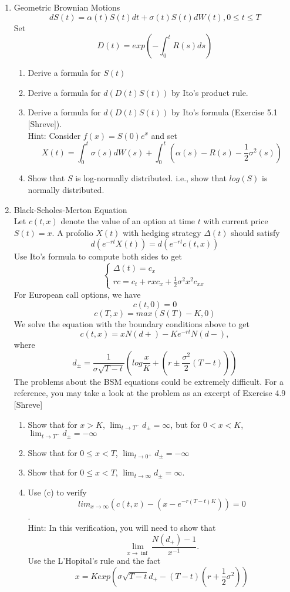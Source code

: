 \documentclass[12pt]{article}
\begin{document}
\begin{enumerate}
\begin{enumerate}
\end{enumerate}
\newpage
\item Geometric Brownian Motions
\[dS(t) = \alpha(t)S(t)dt+\sigma(t)S(t)dW(t), 0\leq t\leq T\]
Set 
\[ D(t) = exp\left(-\int_0^t R(s)ds\right)\]
\begin{enumerate}
\item Derive a formula for $S(t)$
\item Derive a formula for $d(D(t)S(t))$ by Ito's product rule.
\item Derive a formula for $d(D(t)S(t))$ by Ito's formula (Exercise 5.1 [Shreve]). 
\\
Hint: Consider $f(x) = S(0)e^x$ and set 
\[
X(t) = \int_0^t \sigma(s)dW(s) + \int_0^t \left(\alpha(s)-R(s)-\frac12\sigma^2(s) \right)
\]
\item Show that $S$ is log-normally distributed. i.e., show that $log(S)$ is normally distributed.
\end{enumerate}
\newpage
\item Black-Scholes-Merton Equation
\\
Let $c(t,x)$ denote the value of an option at time $t$ with current price $S(t)=x$. A profolio $X(t)$ with hedging strategy $\Delta(t)$ should satisfy
\[
d(e^{-rt}X(t)) = d(e^{-rt}c(t,x))
\]
Use Ito's formula to compute both sides to get
\[
\left\{
\begin{array}{l}
\Delta(t) = c_x \\
rc = c_t +rxc_x + \frac12 \sigma^2 x^2 c_{xx}
\end{array}
\right.
\]
For European call options, we have
\[
c(t,0) = 0
\]
\[
c(T,x) = max(S(T)-K, 0)
\]
We solve the equation with the boundary conditions above to get 
\[
c(t,x)=xN(d+)-Ke^{-rt}N(d-),
\]
where
\[
d_{\pm} = \frac1{\sigma\sqrt{T-t}} \left(log \frac xK + \left(r\pm \frac {\sigma^2}{2}(T-t) \right) \right)
\]
The problems about the BSM equations could be extremely difficult. For a reference, you may take a look at the problem as an excerpt of Exercise 4.9 [Shreve]
\begin{enumerate}
\item Show that for $x>K$, $\lim_{t\to T^-}d_{\pm}=\infty$, but for $0< x< K$,  $\lim_{t\to T^-}d_{\pm}=-\infty$
\item Show that for $0\leq x<T$,  $\lim_{t\to 0^+}d_{\pm}=-\infty$
\item Show that for $0\leq x<T$,  $\lim_{t\to \infty}d_{\pm}=\infty$.
\item Use (c) to verify \[ lim_{x\to\infty} \left(c(t,x)-(x-e^{-r(T-t)K})\right)=0 \]. 
\\
Hint: In this verification, you will need to show that 
\[
\lim_{x\to\inf} \frac{N(d_+)-1}{x^{-1}}.
\]
Use the L'Hopital's rule and the fact
\[
x=K exp\left(\sigma\sqrt{T-t}d_+ - (T-t)\left(r+\frac12\sigma^2\right) \right)
\]
\end{enumerate}
\end{enumerate}
\end{document}
